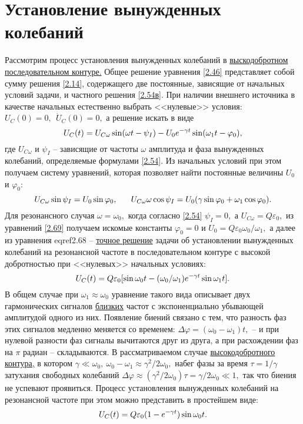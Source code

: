 \section{Установление вынужденных колебаний}

Рассмотрим процесс установления вынужденных колебаний в \underline{выскодобротном последовательном контуре.} Общее решение уравнения \eqref{2.46} представляет собой сумму решения \eqref{2.14}, содержащего две постоянные, зависящие от начальных условий задачи, и частного решения \eqref{2.54в}. При наличии внешнего источника в качестве начальных естественно выбрать <<нулевые>> условия: $U_C(0)=0,~~\dot U_C(0)=0,$ а решение искать в виде
\begin{equation}
	\eqmark{2.68}
	U_C(t)=U_{C\omega}\sin(\omega t-\psi_I)-U_0e^{-\gamma t}\sin(\omega_1t-\varphi_0),
\end{equation}
где $U_{C\omega}$ и $\psi_I$ – зависящие от частоты $\omega$ амплитуда и фаза вынужденных колебаний, определяемые формулами \eqref{2.54}. Из начальных условий при этом получаем систему уравнений, которая позволяет найти постоянные величины $U_0$ и $\varphi_0:$
\begin{equation}
	\eqmark{2.69}
	U_{C\omega}\sin\psi_I=U_0\sin\varphi_0,~~~~~U_{C\omega}\omega\cos\psi_I=U_0(\gamma\sin\varphi_0+\omega_1\cos\varphi_0).
\end{equation}
Для резонансного случая $\omega=\omega_0,$ когда согласно \eqref{2.54} $\psi_I=0,$ а $U_{C\omega}=Q\varepsilon_0,$ из уравнений \eqref{2.69} получаем искомые константы $\varphi_0=0$ и $U_0=Q\varepsilon_0\omega_0/\omega_1,$ а далее из уравнения eqref{2.68} – \underline{точное решение} задачи об установлении вынужденных колебаний на резонансной частоте в последовательном контуре с высокой добротностью при <<нулевых>> начальных условиях:
\begin{equation}
	\eqmark{2.70}
	U_{C}(t)=Q\varepsilon_0[\sin\omega_0t-(\omega_0/\omega_1)e^{-\gamma t}\sin\omega_1 t].
\end{equation}
В общем случае при $\omega_1\approx\omega_0$ уравнение такого вида описывает  двух гармонических сигналов \underline{близких} частот с экспоненциально убывающей амплитудой одного из них. Появление биений связано с тем, что разность фаз этих сигналов медленно меняется со временем: $\Delta\varphi=(\omega_0-\omega_1)t,$ – и при нулевой разности фаз сигналы вычитаются друг из друга, а при расхождении фаз на $\pi$ радиан – складываются. В рассматриваемом случае \underline{высокодобротного контура,} в котором $\gamma\ll\omega_0,~\omega_0-\omega_1\approx\gamma^2/2\omega_0,$ набег фазы за время $\tau=1/\gamma$ затухания свободных колебаний $\Delta\varphi\approx(\gamma^2/2\omega_0)\tau=\gamma/2\omega_0\ll1,$  так что биения не успевают проявиться. Процесс установления вынужденных колебаний на резонансной частоте при этом можно представить в простейшем виде:
\begin{equation}\eqmark{2.71}
	U_C(t)=Q\varepsilon_0(1-e^{-\gamma t})\sin\omega_0 t.
\end{equation}

